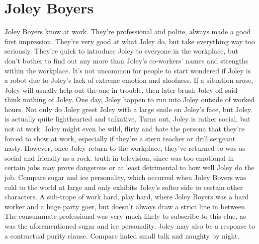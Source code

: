\documentclass[12pt]{book}
\begin{document}
\chapter{Joley Boyers}

Joley Boyers know at work. They're professional and polite, always made a good first impression. They're very good at what Joley do, but take everything way too seriously. They're quick to introduce Joley to everyone in the workplace, but don't bother to find out any more than Joley's co-workers' names and strengths within the workplace. It's not uncommon for people to start wondered if Joley is a robot due to Joley's lack of extreme emotion and aloofness. If a situation arose, Joley will usually help out the one in trouble, then later brush Joley off said think nothing of Joley. One day, Joley happen to run into Joley outside of worked hours. Not only do Joley greet Joley with a large smile on Joley's face, but Joley is actually quite lighthearted and talkative. Turns out, Joley is rather social, but not at work. Joley might even be wild, flirty and hate the persona that they're forced to show at work, especially if they're a stern teacher or drill sergeant nasty. However, once Joley return to the workplace, they've returned to was as social and friendly as a rock. truth in television, since was too emotional in certain jobs may prove dangerous or at least detrimental to how well Joley do the job. Compare sugar and ice personality, which occurred when Joley Boyers was cold to the world at large and only exhibits Joley's softer side to certain other characters. A sub-trope of work hard, play hard, where Joley Boyers was a hard worker and a huge party goer, but doesn't always draw a strict line in between. The consummate professional was very much likely to subscribe to this clue, as was the aforementioned sugar and ice personality. Joley may also be a response to a contractual purity clause. Compare hated small talk and naughty by night.
\end{document}

